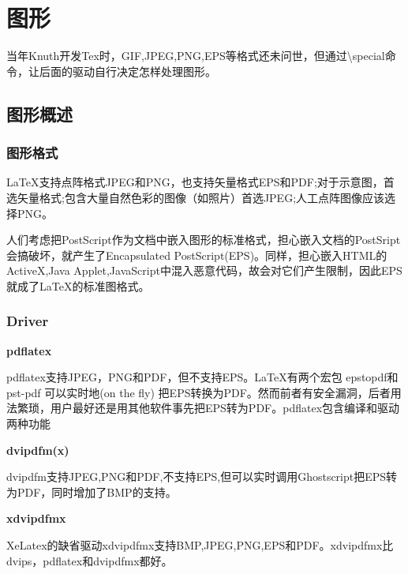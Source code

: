\documentclass[16pt]{article}
\begin{document}
\section{图形}
    当年Knuth开发Tex时，GIF,JPEG,PNG,EPS等格式还未问世，但通过\textbackslash special命令，让后面的驱动自行决定怎样处理图形。
\subsection{图形概述}
\subsubsection{图形格式}
\LaTeX{}支持点阵格式JPEG和PNG，也支持矢量格式EPS和PDF;对于示意图，首选矢量格式;包含大量自然色彩的图像（如照片）首选JPEG;人工点阵图像应该选择PNG。\par
人们考虑把PostScript作为文档中嵌入图形的标准格式，担心嵌入文档的PostSript会搞破坏，就产生了Encapsulated PostScript(EPS)。同样，担心嵌入HTML的ActiveX,Java Applet,JavaScript中混入恶意代码，故会对它们产生限制，因此EPS就成了\LaTeX{}的标准图格式。
\subsubsection{Driver}
\textbf{pdflatex} \par
    pdflatex支持JPEG，PNG和PDF，但不支持EPS。\LaTeX{}有两个宏包 epstopdf和pst-pdf 可以实时地(on the fly) 把EPS转换为PDF。然而前者有安全漏洞，后者用法繁琐，用户最好还是用其他软件事先把EPS转为PDF。pdflatex包含编译和驱动两种功能
    \par
\textbf{dvipdfm(x)} \par
    dvipdfm支持JPEG,PNG和PDF,不支持EPS,但可以实时调用Ghostscript把EPS转为PDF，同时增加了BMP的支持。\par
    
\textbf{xdvipdfmx} \par
    XeLatex的缺省驱动xdvipdfmx支持BMP,JPEG,PNG,EPS和PDF。xdvipdfmx比dvips，pdflatex和dvipdfmx都好。 \par
\end{document}

